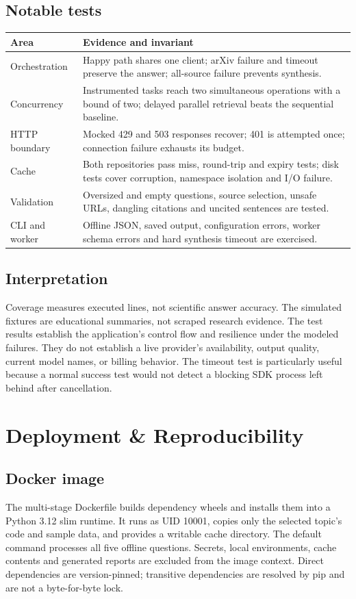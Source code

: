 \documentclass[11pt,a4paper]{article}
\begin{document}
\subsection{Notable tests}
\noindent\begin{tabularx}{\linewidth}{@{}p{3.3cm}>{\raggedright\arraybackslash}X@{}}\toprule
Area & Evidence and invariant\\\midrule
Orchestration & Happy path shares one client; arXiv failure and timeout preserve the answer; all-source failure prevents synthesis.\\
Concurrency & Instrumented tasks reach two simultaneous operations with a bound of two; delayed parallel retrieval beats the sequential baseline.\\
HTTP boundary & Mocked 429 and 503 responses recover; 401 is attempted once; connection failure exhausts its budget.\\
Cache & Both repositories pass miss, round-trip and expiry tests; disk tests cover corruption, namespace isolation and I/O failure.\\
Validation & Oversized and empty questions, source selection, unsafe URLs, dangling citations and uncited sentences are tested.\\
CLI and worker & Offline JSON, saved output, configuration errors, worker schema errors and hard synthesis timeout are exercised.\\\bottomrule
\end{tabularx}\par

\subsection{Interpretation}
Coverage measures executed lines, not scientific answer accuracy. The simulated fixtures are educational summaries, not scraped research evidence. The test results establish the application's control flow and resilience under the modeled failures. They do not establish a live provider's availability, output quality, current model names, or billing behavior. The timeout test is particularly useful because a normal success test would not detect a blocking SDK process left behind after cancellation.

\clearpage
\section{Deployment \& Reproducibility}
\subsection{Docker image}
The multi-stage Dockerfile builds dependency wheels and installs them into a Python 3.12 slim runtime. It runs as UID 10001, copies only the selected topic's code and sample data, and provides a writable cache directory. The default command processes all five offline questions. Secrets, local environments, cache contents and generated reports are excluded from the image context. Direct dependencies are version-pinned; transitive dependencies are resolved by pip and are not a byte-for-byte lock.
\end{document}
